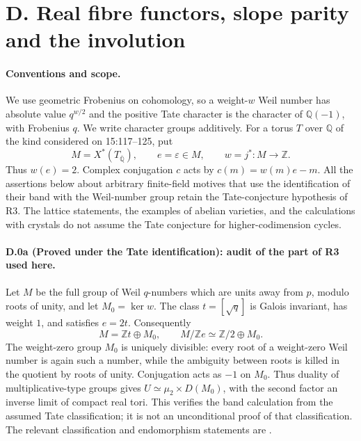 \section{D. Real fibre functors, slope parity and the involution}
\label{sec:real-weil-D}

\paragraph{Conventions and scope.}
We use geometric Frobenius on cohomology, so a weight-$w$ Weil number has absolute
value $q^{w/2}$ and the positive Tate character is the character of $\mathbb Q(-1)$,
with Frobenius $q$. We write character groups additively. For a torus $T$ over
$\mathbb Q$ of the kind considered on 15:117--125, put
\[
 M=X^*(T_{\overline{\mathbb Q}}),\qquad e=\varepsilon\in M,
 \qquad w=j^*:M\longrightarrow\mathbb Z.
\]
Thus $w(e)=2$. Complex conjugation $c$ acts by
$c(m)=w(m)e-m$. All the assertions below about arbitrary finite-field motives
that use the identification of their band with the Weil-number group retain the
Tate-conjecture hypothesis of R3. The lattice statements, the examples of
abelian varieties, and the calculations with crystals do not assume the Tate
conjecture for higher-codimension cycles.

\paragraph{D.0a (Proved under the Tate identification): audit of the part of R3 used here.}
Let $M$ be the full group of Weil $q$-numbers which are units away from
$p$, modulo roots of unity, and let $M_0=\ker w$. The class
$t=[\sqrt q]$ is Galois invariant, has weight $1$, and satisfies $e=2t$.
Consequently
\[
 M=\mathbb Zt\oplus M_0,\qquad
 M/\mathbb Ze\simeq\mathbb Z/2\oplus M_0.
\]
The weight-zero group $M_0$ is uniquely divisible: every root of a
weight-zero Weil number is again such a number, while the ambiguity
between roots is killed in the quotient by roots of unity. Conjugation
acts as $-1$ on $M_0$. Thus duality of multiplicative-type groups gives
$U\simeq\mu_2\times D(M_0)$, with the second factor an inverse limit of
compact real tori. This verifies the band calculation from the assumed
Tate classification; it is not an unconditional proof of that
classification. The relevant classification and endomorphism statements
are \citet[Proposition 2.6 and Theorem 2.19]{Milne1994}.

